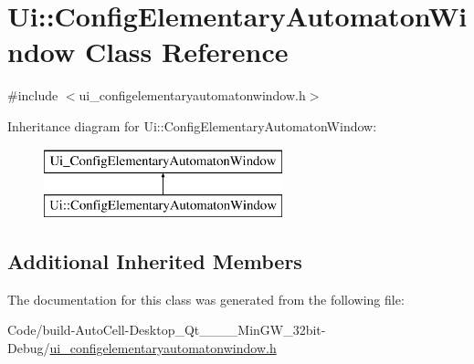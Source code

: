 \hypertarget{class_ui_1_1_config_elementary_automaton_window}{}\section{Ui\+:\+:Config\+Elementary\+Automaton\+Window Class Reference}
\label{class_ui_1_1_config_elementary_automaton_window}


{\ttfamily \#include $<$ui\+\_\+configelementaryautomatonwindow.\+h$>$}

Inheritance diagram for Ui\+:\+:Config\+Elementary\+Automaton\+Window\+:\begin{figure}[H]
\begin{center}
\leavevmode
\includegraphics[height=2.000000cm]{class_ui_1_1_config_elementary_automaton_window}
\end{center}
\end{figure}
\subsection*{Additional Inherited Members}


The documentation for this class was generated from the following file\+:\begin{DoxyCompactItemize}
\item 
Code/build-\/\+Auto\+Cell-\/\+Desktop\+\_\+\+Qt\+\_\+\_\+\_\+\_\+\+Min\+G\+W\+\_\+32bit-\/\+Debug/\mbox{\hyperlink{ui__configelementaryautomatonwindow_8h}{ui\+\_\+configelementaryautomatonwindow.\+h}}\end{DoxyCompactItemize}
